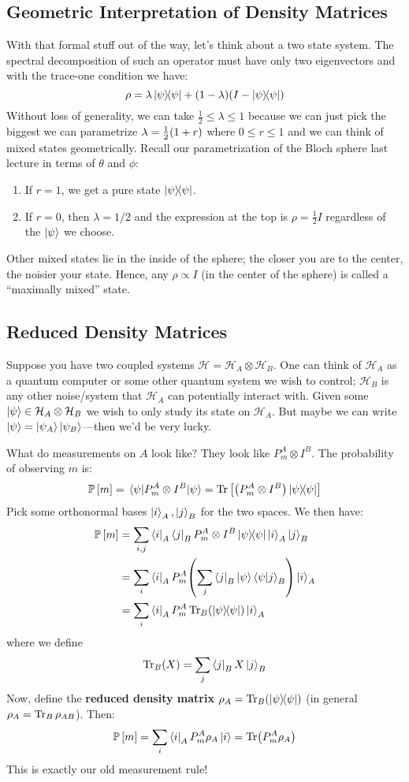 \subsection{Geometric Interpretation of Density Matrices}

With that formal stuff out of the way, let's think about a two state system. The spectral decomposition
of such an operator must have only two eigenvectors and with the trace-one condition we have:
\[ \rho = \lambda \ketbra{\psi}{\psi} + (1 - \lambda)(I - \ketbra{\psi}{\psi}) \]
Without loss of generality, we can take $\frac{1}{2} \leq \lambda \leq 1$ because we can just pick the biggest
we can parametrize $\lambda = \frac{1}{2} \qty(1 + r)$ where $0 \leq r \leq 1$ and we can think of
mixed states geometrically. Recall our parametrization of the Bloch sphere last lecture in terms of $\theta$ and $\phi$:
\begin{enumerate}
    \item If $r = 1$, we get a pure state $\ketbra{\psi}{\psi}$.
    \item If $r = 0$, then $\lambda = 1/2$ and the expression at the top is $\rho = \frac{1}{2} I$
    regardless of the $\ket{\psi}$ we choose. 
\end{enumerate}
Other mixed states lie in the inside of the sphere; the closer you are to the center, the noisier your state. Hence, any $\rho \propto I$ (in the center of the sphere) is called a
``maximally mixed'' state.

\subsection{Reduced Density Matrices}
Suppose you have two coupled systems $\mathcal{H} = \mathcal{H}_A \otimes \mathcal{H}_B$. One can think
of $\mathcal{H}_A$ as a quantum computer or some other quantum system we wish to control; $\mathcal{H}_B$ is any other
noise/system that $\mathcal{H}_A$ can potentially interact with. Given some $\ket{\psi} \in \mathcal{H}_A \otimes \mathcal{H}_B$
we wish to only study its state on $\mathcal{H}_A$. But maybe we can write $\ket{\psi} = \ket{\psi_A} \ket{\psi_B}$—then we'd be very lucky.

What do measurements on $A$ look like? They look like $P_m^{A} \otimes I^B$. The probability of observing $m$ is:
\[ \mathbb{P}\left[ m \right] = \mel{\psi}{P_m^A \otimes I^B}{\psi} = \Tr\qty[\qty(P_m^A \otimes I^B) \ketbra{\psi}{\psi}] \]
Pick some orthonormal bases $\ket{i}_A, \ket{j}_B$ for the two spaces. We then have:
\begin{align*}
    \mathbb{P}\left[ m \right] &= \sum_{i, j} \bra{i}_A \bra{j}_B P_m^A \otimes I^B \ketbra{\psi}{\psi} \ket{i}_A \ket{j}_B \\
    &= \sum_{i} \bra{i}_A P_m^A \qty(\sum_j \bra{j}_B\ket{\psi} \bra{\psi} \ket{j}_B) \ket{i}_A \\
    &= \sum_{i} \bra{i}_A P_m^A \Tr_B(\ketbra{\psi}{\psi}) \ket{i}_A
\end{align*}
where we define 
\[ \Tr_B(X) = \sum_j \bra{j}_B X \ket{j}_B \]
Now, define the \textbf{reduced density matrix} $\rho_A = \Tr_B(\ketbra{\psi}{\psi})$ (in general $\rho_A = \Tr_B \rho_{AB}$). Then:
\[ \mathbb{P}\left[ m \right] = \sum_i \bra{i}_A P_m^A \rho_A \ket{i} = \Tr(P_m^A \rho_A) \]
This is exactly our old measurement rule!

